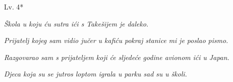 	\begin{mondai}{Lv. 4*}
		\item \textit{Škola u koju ću sutra ići s Takešijem je daleko.}
		\item \textit{Prijatelj kojeg sam vidio jučer u kafiću pokraj stanice mi je poslao pismo.}
		\item \textit{Razgovarao sam s prijateljem koji će sljedeće godine avionom ići u Japan.}
		\item \textit{Djeca koja su se jutros loptom igrala u parku sad su u školi.}
	\end{mondai}
